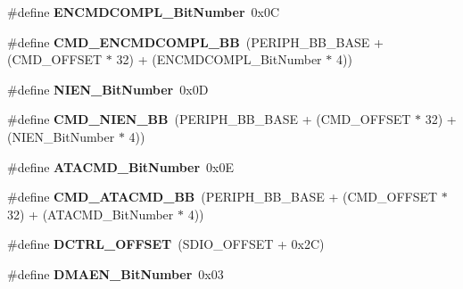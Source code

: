 \begin{DoxyCompactItemize}
\item 
\hypertarget{group___s_d_i_o_ga1d1112c7b804791a0fffd8b317085aeb}{\#define {\bfseries E\-N\-C\-M\-D\-C\-O\-M\-P\-L\-\_\-\-Bit\-Number}~0x0\-C}\label{group___s_d_i_o_ga1d1112c7b804791a0fffd8b317085aeb}

\item 
\hypertarget{group___s_d_i_o_gade06098d1616639ce5f1b70675280b7c}{\#define {\bfseries C\-M\-D\-\_\-\-E\-N\-C\-M\-D\-C\-O\-M\-P\-L\-\_\-\-B\-B}~(P\-E\-R\-I\-P\-H\-\_\-\-B\-B\-\_\-\-B\-A\-S\-E + (C\-M\-D\-\_\-\-O\-F\-F\-S\-E\-T $\ast$ 32) + (E\-N\-C\-M\-D\-C\-O\-M\-P\-L\-\_\-\-Bit\-Number $\ast$ 4))}\label{group___s_d_i_o_gade06098d1616639ce5f1b70675280b7c}

\item 
\hypertarget{group___s_d_i_o_gab6d83a7ccd4a0d9ea9a09fec263fb25f}{\#define {\bfseries N\-I\-E\-N\-\_\-\-Bit\-Number}~0x0\-D}\label{group___s_d_i_o_gab6d83a7ccd4a0d9ea9a09fec263fb25f}

\item 
\hypertarget{group___s_d_i_o_ga08623f1d053677de8b20a6f5f5090edd}{\#define {\bfseries C\-M\-D\-\_\-\-N\-I\-E\-N\-\_\-\-B\-B}~(P\-E\-R\-I\-P\-H\-\_\-\-B\-B\-\_\-\-B\-A\-S\-E + (C\-M\-D\-\_\-\-O\-F\-F\-S\-E\-T $\ast$ 32) + (N\-I\-E\-N\-\_\-\-Bit\-Number $\ast$ 4))}\label{group___s_d_i_o_ga08623f1d053677de8b20a6f5f5090edd}

\item 
\hypertarget{group___s_d_i_o_gabd4fd3bb700b879f843ccc867db1832e}{\#define {\bfseries A\-T\-A\-C\-M\-D\-\_\-\-Bit\-Number}~0x0\-E}\label{group___s_d_i_o_gabd4fd3bb700b879f843ccc867db1832e}

\item 
\hypertarget{group___s_d_i_o_gabb7e537f931b6fdd3b49e826f2e19d7c}{\#define {\bfseries C\-M\-D\-\_\-\-A\-T\-A\-C\-M\-D\-\_\-\-B\-B}~(P\-E\-R\-I\-P\-H\-\_\-\-B\-B\-\_\-\-B\-A\-S\-E + (C\-M\-D\-\_\-\-O\-F\-F\-S\-E\-T $\ast$ 32) + (A\-T\-A\-C\-M\-D\-\_\-\-Bit\-Number $\ast$ 4))}\label{group___s_d_i_o_gabb7e537f931b6fdd3b49e826f2e19d7c}

\item 
\hypertarget{group___s_d_i_o_ga948c1382c4cfd3af3e406c4d0cdd4240}{\#define {\bfseries D\-C\-T\-R\-L\-\_\-\-O\-F\-F\-S\-E\-T}~(S\-D\-I\-O\-\_\-\-O\-F\-F\-S\-E\-T + 0x2\-C)}\label{group___s_d_i_o_ga948c1382c4cfd3af3e406c4d0cdd4240}

\item 
\hypertarget{group___s_d_i_o_gab2af311e327213503f0dbf3d013b7944}{\#define {\bfseries D\-M\-A\-E\-N\-\_\-\-Bit\-Number}~0x03}\label{group___s_d_i_o_gab2af311e327213503f0dbf3d013b7944}


\end{DoxyCompactItemize}
